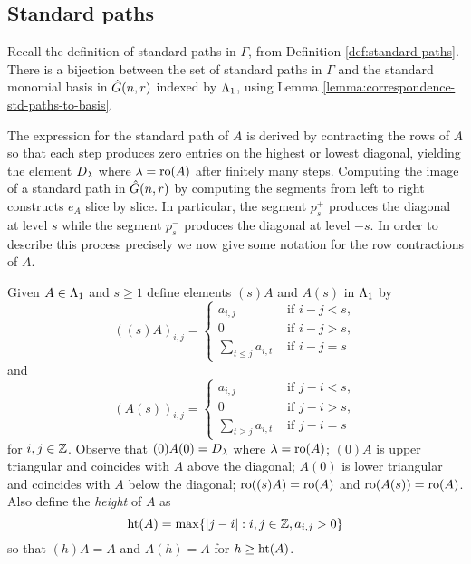 \documentclass[a4paper, 11pt]{report}
\begin{document}
\subsection{Standard paths}

Recall the definition of standard paths in $\Gamma$, from Definition \ref{def:standard-paths}. There is a bijection between the set of standard paths in $\Gamma$ and the standard monomial basis in $\hat{G}(n,r)$ indexed by $\Lambda_1{}$, using Lemma \ref{lemma:correspondence-std-paths-to-basis}.

The expression for the standard path of $A$ is derived by contracting the rows of $A$ so that each step produces zero entries on the highest or lowest diagonal, yielding the element $D_{\lambda}$ where $\lambda=\operatorname{ro}(A)$ after finitely many steps. Computing the image of a standard path in $\hat{G}(n,r)$ by computing the segments from left to right constructs $e_A$ slice by slice. In particular, the segment $p_s^+$ produces the diagonal at level $s$ while the segment $p_s^-$ produces the diagonal at level $-s$. In order to describe this process precisely we now give some notation for the row contractions of $A$.

Given $A\in\Lambda_1{}$ and $s\geq 1$ define elements $(s)A$ and $A(s)$ in $\Lambda_1{}$ by
\begin{equation*}
\left((s)A\right)_{i,j} = \begin{cases}
a_{i,j} &\text{ if } i-j<s,\\
0 &\text{ if } i-j>s,\\
\sum_{t\le j} a_{i,t} &\text{ if } i-j=s
\end{cases}
\end{equation*}
and
\begin{equation*}
\left(A(s)\right)_{i,j} = \begin{cases}
a_{i,j} &\text{ if } j-i<s,\\
0 &\text{ if } j-i>s,\\
\sum_{t\geq j} a_{i,t} &\text{ if } j-i=s
\end{cases}
\end{equation*}
for $i,j\in\mathbb{Z}$. Observe that $(0)A(0)=D_{\lambda}$ where $\lambda=\operatorname{ro}(A)$; $(0)A$ is upper triangular and coincides with $A$ above the diagonal; $A(0)$ is lower triangular and coincides with $A$ below the diagonal; $\operatorname{ro}((s)A)=\operatorname{ro}(A)$ and $\operatorname{ro}(A(s))=\operatorname{ro}(A)$. Also define the \emph{height} of $A$ as
\begin{equation*}
\operatorname{ht}(A) = \max\{|j-i|:i,j\in\mathbb{Z}, a_{i,j}>0\}
\end{equation*}
so that $(h)A=A$ and $A(h)=A$ for $h\geq\operatorname{ht}(A)$.
\end{document}

